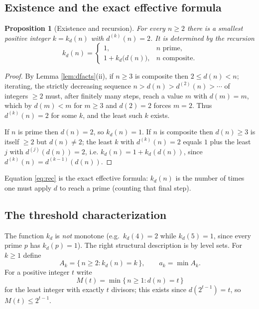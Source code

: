 \documentclass{amsart}
\newtheorem{proposition}{Proposition}
\theoremstyle{definition}
\begin{document}
\subsection{Existence and the exact effective formula}

\begin{proposition}[Existence and recursion]\label{prop:akd}
For every $n\ge 2$ there is a smallest positive integer $k=k_d(n)$ with
$d^{(k)}(n)=2$. It is determined by the recursion
\begin{equation}\label{eq:rec}
k_d(n)=\begin{cases}
1, & n \text{ prime},\\[2pt]
1+k_d\bigl(d(n)\bigr), & n \text{ composite}.
\end{cases}
\end{equation}
\end{proposition}

\begin{proof}
By Lemma \ref{lem:dfacts}(ii), if $n\ge 3$ is composite then
$2\le d(n)<n$; iterating, the strictly decreasing sequence
$n>d(n)>d^{(2)}(n)>\cdots$ of integers $\ge 2$ must, after finitely many
steps, reach a value $m$ with $d(m)=m$, which by $d(m)<m$ for $m\ge3$ and
$d(2)=2$ forces $m=2$. Thus $d^{(k)}(n)=2$ for some $k$, and the least such
$k$ exists.

If $n$ is prime then $d(n)=2$, so $k_d(n)=1$. If $n$ is composite then
$d(n)\ge 3$ is itself $\ge 2$ but $d(n)\neq 2$; the least $k$ with
$d^{(k)}(n)=2$ equals $1$ plus the least $j$ with $d^{(j)}(d(n))=2$, i.e.
$k_d(n)=1+k_d(d(n))$, since $d^{(k)}(n)=d^{(k-1)}(d(n))$.
\end{proof}

Equation \eqref{eq:rec} is the exact effective formula: $k_d(n)$ is the number
of times one must apply $d$ to reach a prime (counting that final step).

\subsection{The threshold characterization}

The function $k_d$ is \emph{not} monotone (e.g.\ $k_d(4)=2$ while
$k_d(5)=1$, since every prime $p$ has $k_d(p)=1$). The right structural
description is by level sets. For $k\ge 1$ define
\[
A_k=\{\,n\ge 2: k_d(n)=k\,\},\qquad a_k=\min A_k .
\]
For a positive integer $t$ write
\[
M(t)=\min\{\,n\ge1:d(n)=t\,\}
\]
for the least integer with exactly $t$ divisors; this exists since
$d(2^{t-1})=t$, so $M(t)\le 2^{t-1}$.
\end{document}
